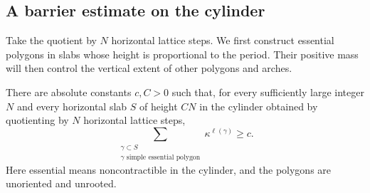 \subsection{A barrier estimate on the cylinder}\label{c6:subheading-12}

Take the quotient by \(N\) horizontal lattice steps. We first construct essential polygons in slabs whose height is proportional to the period. Their positive mass will then control the vertical extent of other polygons and arches.

\begin{proposition}\label{prop:slab-essential-polygons}
There are absolute constants $c,C>0$ such that, for every sufficiently large integer $N$ and every horizontal slab $S$ of height $CN$ in the cylinder obtained by quotienting by $N$ horizontal lattice steps,
\[
 \sum_{\substack{\gamma\subset S\\ \gamma\text{ simple essential polygon}}}
       \kappa^{\ell(\gamma)}\ge c.
\]
Here essential means noncontractible in the cylinder, and the polygons are unoriented and unrooted.
\end{proposition}
